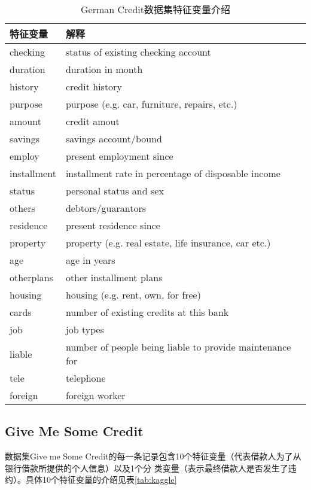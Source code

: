 \begin{table}[htbp]
	\centering
	\caption{\label{tab:german}German Credit数据集特征变量介绍}
	\begin{tabular}{ll}
		\toprule
		   特征变量    & 解释 \\
		\midrule
		   checking    & status of existing checking account\\
		   duration    & duration in month\\
		   history     & credit history \\
		   purpose     & purpose (e.g. car, furniture, repairs, etc.)\\
		   amount      & credit amout \\
		   savings     & savings account/bound \\
		   employ      & present employment since \\
		   installment & installment rate in percentage of disposable income \\
		   status      & personal status and sex \\
		   others      & debtors/guarantors \\
		   residence   & present residence since \\
		   property    & property (e.g. real estate, life insurance, car etc.) \\
		   age         & age in years \\
		   otherplans  & other installment plans \\
		   housing     & housing (e.g. rent, own, for free) \\
		   cards       & number of existing credits at this bank \\
		   job         & job types \\
		   liable      & number of people being liable to provide maintenance for \\
		   tele        & telephone \\
		   foreign     & foreign worker \\
		\bottomrule
	\end{tabular}
\end{table}

\subsection{Give Me Some Credit}
数据集Give me Some Credit的每一条记录包含10个特征变量（代表借款人为了从银行借款所提供的个人信息）以及1个分
类变量（表示最终借款人是否发生了违约）。具体10个特征变量的介绍见表\ref{tab:kaggle}

